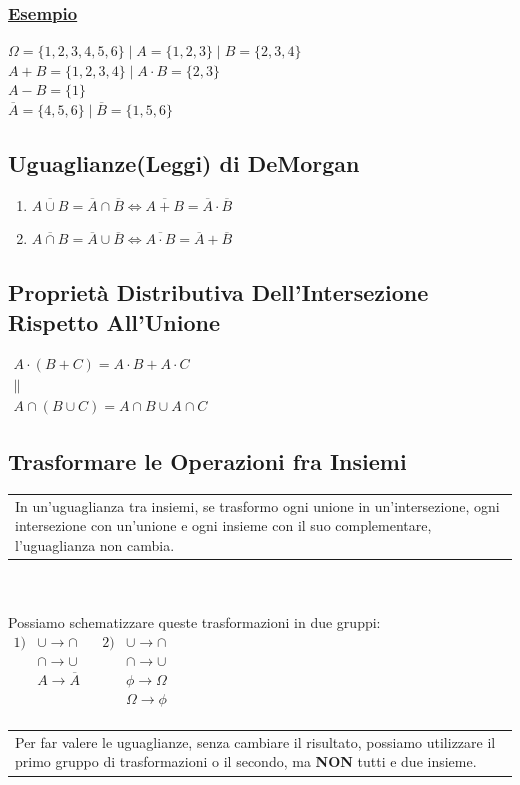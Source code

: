 \documentclass{article}
\begin{document}
\subsubsection{\underline{Esempio}}
$\Omega = \{ 1,2,3,4,5,6 \} \; \big| \; A=\{ 1,2,3 \} \; \big| \; B =\{ 2,3,4\}$ \\
$A + B = \{ 1,2,3,4 \} \; \big| \; A \cdot B = \{ 2,3 \}$ \\
$A - B = \{ 1 \}$ \\
$\overline{A} = \{ 4,5,6 \} \; \big| \; \overline{B} = \{ 1,5,6 \}$

\subsection{Uguaglianze(Leggi) di DeMorgan}
\begin{enumerate}
    \item $\overline{A \cup B} = \overline{A} \cap \overline{B} \iff \overline{A + B} = \overline{A} \cdot \overline{B}$
    \item $\overline{A \cap B} = \overline{A} \cup \overline{B} \iff \overline{A \cdot B} = \overline{A} + \overline{B}$
\end{enumerate}

\subsection{Proprietà Distributiva Dell’Intersezione Rispetto All’Unione}
$\begin{matrix}
A \cdot (B + C) = A \cdot B + A \cdot C \\
\parallel \\
A \cap (B \cup C) = A \cap B \cup A \cap C
\end{matrix}$
\subsection{Trasformare le Operazioni fra Insiemi}
\begin{tabular}{|p{13cm}}
In un’uguaglianza tra insiemi, se trasformo ogni unione in un’intersezione, ogni intersezione con un’unione e ogni insieme con il suo complementare, l’uguaglianza non cambia.
\end{tabular} \\ \\
Possiamo schematizzare queste trasformazioni in due gruppi: \\
$\begin{matrix}
1) & \cup \rightarrow \cap && 2) & \cup \rightarrow \cap \\
& \cap \rightarrow \cup && & \cap \rightarrow \cup \\
& A \rightarrow \overline{A} && & \phi \rightarrow \Omega \\
&  && & \Omega \rightarrow \phi \\
\end{matrix}$ \\
\begin{tabular}{|p{13cm}}
Per far valere le uguaglianze, senza cambiare il risultato, possiamo utilizzare il primo gruppo di trasformazioni o il secondo, ma \textbf{NON} tutti e due insieme.
\end{tabular}
\end{document}

